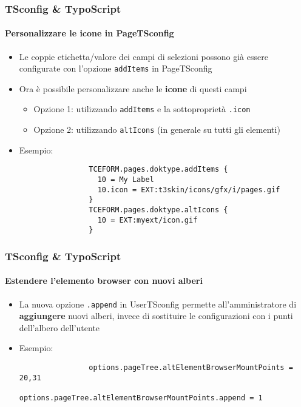 \begin{frame}[fragile]
	\frametitle{TSconfig \& TypoScript}
	\framesubtitle{Personalizzare le icone in PageTSconfig}

	\begin{itemize}
		\item Le coppie etichetta/valore dei campi di selezioni possono già essere configurate con l'opzione \texttt{addItems} in PageTSconfig
		\item Ora è possibile personalizzare anche le \textbf{icone} di questi campi

			\begin{itemize}
				\item Opzione 1: utilizzando \texttt{addItems} e la sottoproprietà \texttt{.icon}
				\item Opzione 2: utilizzando \texttt{altIcons} (in generale su tutti gli elementi)
			\end{itemize}

		\item Esempio:

			\begin{lstlisting}
				TCEFORM.pages.doktype.addItems {
				  10 = My Label
				  10.icon = EXT:t3skin/icons/gfx/i/pages.gif
				}
				TCEFORM.pages.doktype.altIcons {
				  10 = EXT:myext/icon.gif
				}
			\end{lstlisting}

	\end{itemize}

\end{frame}


\begin{frame}[fragile]
	\frametitle{TSconfig \& TypoScript}
	\framesubtitle{Estendere l'elemento browser con nuovi alberi}

	\begin{itemize}
		\item La nuova opzione \texttt{.append} in UserTSconfig permette all'amministratore di \textbf{aggiungere}
			nuovi alberi, invece di sostituire le configurazioni con i punti dell'albero dell'utente 

		\item Esempio:

			\begin{lstlisting}
				options.pageTree.altElementBrowserMountPoints = 20,31
				options.pageTree.altElementBrowserMountPoints.append = 1
			\end{lstlisting}

	\end{itemize}

\end{frame}

